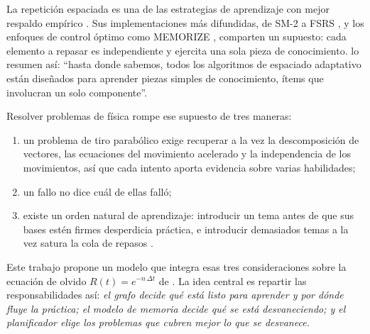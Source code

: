 \documentclass[11pt]{article}
\theoremstyle{definition}
\theoremstyle{remark}
\begin{document}
La repetición espaciada es una de las estrategias de aprendizaje con mejor respaldo empírico \citep{cepeda2006,cepeda2008}. Sus implementaciones más difundidas, de SM-2 \citep{wozniak1990} a FSRS \citep{ye2022}, y los enfoques de control óptimo como MEMORIZE \citep{tabibian2019}, comparten un supuesto: cada elemento a repasar es independiente y ejercita una sola pieza de conocimiento. \citet{choffin2021} lo resumen así: ``hasta donde sabemos, todos los algoritmos de espaciado adaptativo están diseñados para aprender piezas simples de conocimiento, ítems que involucran un solo componente''.

Resolver problemas de física rompe ese supuesto de tres maneras:
\begin{enumerate}[label=(\alph*)]
\item un problema de tiro parabólico exige recuperar a la vez la descomposición de vectores, las ecuaciones del movimiento acelerado y la independencia de los movimientos, así que cada intento aporta evidencia sobre varias habilidades;
\item un fallo no dice cuál de ellas falló;
\item existe un orden natural de aprendizaje: introducir un tema antes de que sus bases estén firmes desperdicia práctica, e introducir demasiados temas a la vez satura la cola de repasos \citep{reddy2016}.
\end{enumerate}

Este trabajo propone un modelo que integra esas tres consideraciones sobre la ecuación de olvido $R(t)=e^{-n\,\Delta t}$ de \citet{tabibian2019}. La idea central es repartir las responsabilidades así: \emph{el grafo decide qué está listo para aprender y por dónde fluye la práctica; el modelo de memoria decide qué se está desvaneciendo; y el planificador elige los problemas que cubren mejor lo que se desvanece.}
\end{document}
